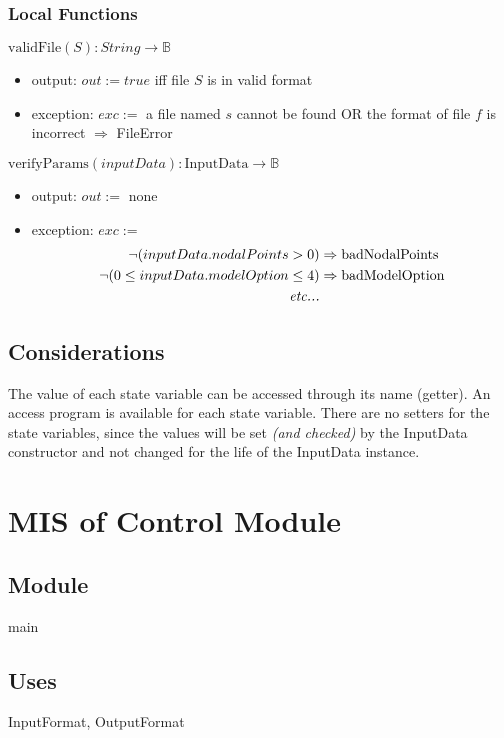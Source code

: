\documentclass[12pt, titlepage]{article}
\begin{document}
\subsubsection{Local Functions}

$\text{validFile}(S): String \rightarrow \mathbb{B}$
\begin{itemize}
  \item output: $out := true$ iff file $S$ is in valid format
  \item exception: $exc := $ a file named $s$ cannot be found OR the format of file $f$ is incorrect 
  $\Rightarrow$ FileError
\end{itemize}

\noindent $\text{verifyParams}(inputData): \text{InputData} \rightarrow \mathbb{B}$
\begin{itemize}
  \item output: $out := $ none
  \item exception: $exc := $ 
  \begin{align*}
  \neg(inputData.nodalPoints > 0) &\Rightarrow \text{badNodalPoints} \\
  \neg(0 \le inputData.modelOption \le 4) &\Rightarrow \text{badModelOption} \\
  \emph{etc...} \\
  \end{align*}
\end{itemize}

\subsection{Considerations}
The value of each state variable can be accessed through its name 
(getter). An access program is available for each state variable. 
There are no setters for the state variables, since the values will 
be set \emph{(and checked)} by the InputData constructor and not changed
for the life of the InputData instance. 

\pagebreak
\section{MIS of Control Module} \label{ControlModule} 

\subsection{Module}
main
\subsection{Uses}
InputFormat, OutputFormat
\end{document}
